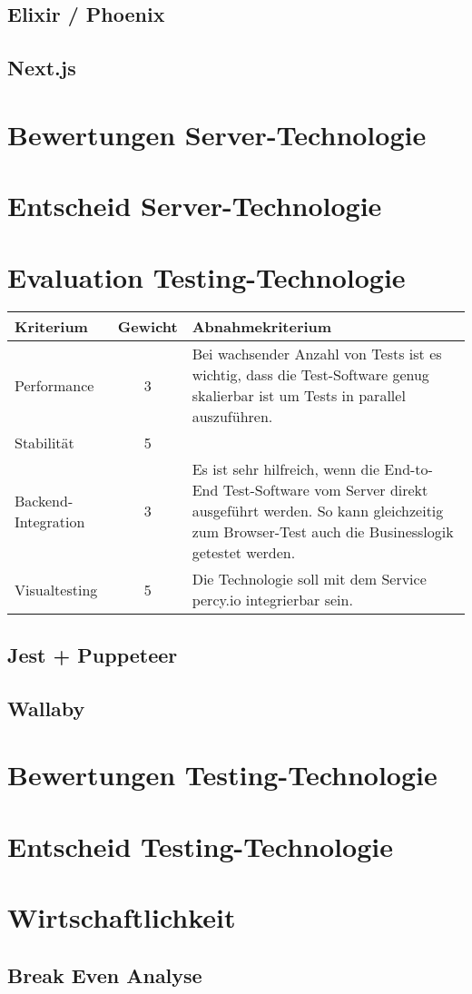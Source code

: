 \subsection{Elixir / Phoenix}
\subsection{Next.js}

\section{Bewertungen Server-Technologie}\label{bewertungen-server-technologie}

\section{Entscheid Server-Technologie}\label{entscheid-server-technologie}

\clearpage
\section{Evaluation Testing-Technologie}\label{evaluation-testing-technologie}

\begin{longtable}[]{@{}p{2cm}cp{10cm}@{}}
  \toprule
  \textbf{Kriterium}  & \textbf{Gewicht} & \textbf{Abnahmekriterium}\tabularnewline
  \midrule
  \endhead
  Performance         & 3                & Bei wachsender Anzahl von Tests ist es wichtig, dass die Test-Software genug skalierbar ist um Tests in parallel auszuführen.\tabularnewline
  \midrule
  Stabilität          & 5                & \tabularnewline
  \midrule
  Backend-Integration & 3                & Es ist sehr hilfreich, wenn die End-to-End Test-Software vom Server direkt ausgeführt werden. So kann gleichzeitig zum Browser-Test auch die Businesslogik getestet werden.\tabularnewline
  \midrule
  Visualtesting       & 5                & Die Technologie soll mit dem Service percy.io integrierbar sein.\tabularnewline
  \bottomrule
\end{longtable}

\subsection{Jest + Puppeteer}
\subsection{Wallaby}

\section{Bewertungen Testing-Technologie}\label{bewertungen-testing-technologie}

\section{Entscheid Testing-Technologie}\label{entscheid-testing-technologie}

\clearpage
\section{Wirtschaftlichkeit}\label{wirtschaftlichkeit}

\subsection{Break Even Analyse}\label{break-even-analyse}
